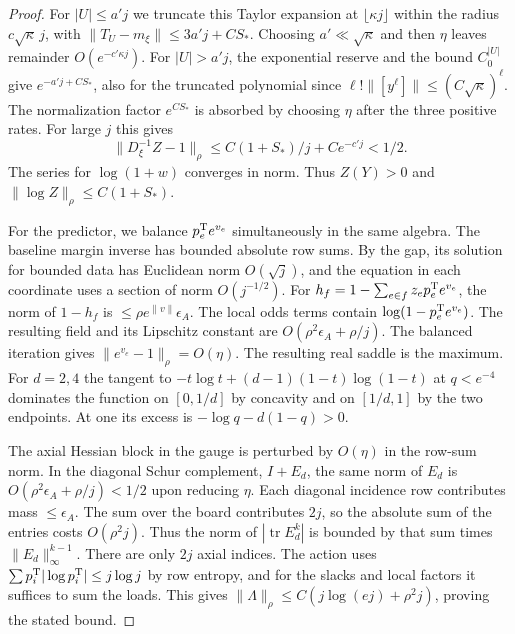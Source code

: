 \begin{proof}
For \(|U|\le a'j\) we truncate this Taylor expansion at \(\lfloor\kappa j\rfloor\) within the radius
\(c\sqrt\kappa\,j\), with \(\|T_U-m_\xi\|\le3a'j+CS_*\). Choosing \(a'\ll\sqrt\kappa\) and then \(\eta\)
leaves remainder \(O(e^{-c'\kappa j})\). For \(|U|>a'j\), the exponential reserve and the bound
\(C_0^{|U|}\) give \(e^{-a'j+CS_*}\), also for the truncated polynomial since
\(\ell!\|[y^\ell]\|\le(C\sqrt\kappa)^\ell\). The normalization factor \(e^{CS_*}\) is absorbed by
choosing \(\eta\) after the three positive rates. For large \(j\) this gives
\begin{equation}\label{eq:positividad-cubo}
 \|D_\xi^{-1}Z-1\|_\rho\le C(1+S_*)/j+Ce^{-c'j}<1/2 .
\end{equation}
The series for \(\log(1+w)\) converges in norm. Thus \(Z(Y)>0\) and \(\|\log Z\|_\rho\le C(1+S_*)\).

For the predictor, we balance \(p^{\rm T}_e e^{v_e}\) simultaneously in the same algebra. The baseline
margin inverse has bounded absolute row sums. By the gap, its solution for bounded data has Euclidean
norm \(O(\sqrt j)\), and the equation in each coordinate uses a section of norm \(O(j^{-1/2})\). For
\(h_f=1-\sum_{e\in f}z_ep^{\rm T}_e e^{v_e}\), the norm of \(1-h_f\) is \(\le \rho e^{\|v\|}\epsilon_A\).
The local odds terms contain \(\log(1-p^{\rm T}_e e^{v_e})\). The resulting field and its Lipschitz
constant are \(O(\rho^2\epsilon_A+\rho/j)\). The balanced iteration gives \(\|e^{v_e}-1\|_\rho=O(\eta)\).
The resulting real saddle is the maximum. For \(d=2,4\) the tangent to \(-t\log t+(d-1)(1-t)\log(1-t)\)
at \(q<e^{-4}\) dominates the function on \([0,1/d]\) by concavity and on \([1/d,1]\) by the two
endpoints. At one its excess is \(-\log q-d(1-q)>0\).

The axial Hessian block in the gauge is perturbed by \(O(\eta)\) in the row-sum norm. In the diagonal
Schur complement, \(I+E_d\), the same norm of \(E_d\) is \(O(\rho^2\epsilon_A+\rho/j)<1/2\) upon reducing
\(\eta\). Each diagonal incidence row contributes mass \(\le\epsilon_A\). The sum over the board
contributes \(2j\), so the absolute sum of the entries costs \(O(\rho^2j)\). Thus the norm of
\(|\operatorname{tr}E_d^k|\) is bounded by that sum times \(\|E_d\|_\infty^{k-1}\). There are only \(2j\)
axial indices. The action uses \(\sum p^{\rm T}_i|\log p^{\rm T}_i|\le j\log j\) by row entropy, and for
the slacks and local factors it suffices to sum the loads. This gives \(\|\Lambda\|_\rho\le
C(j\log(ej)+\rho^2j)\), proving the stated bound.
\end{proof}

